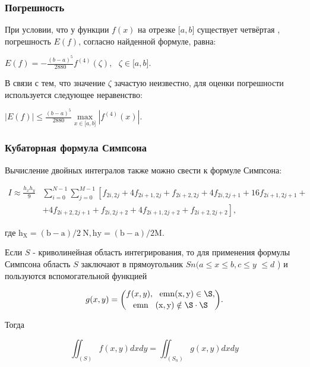 \documentclass[a4paper]{article}
\begin{document}
{{{{{{{{\subsubsection{Погрешность}

При условии, что у функции {{\(f(x)\)}} на отрезке
{{\(\lbrack a,b\rbrack\)}} существует четвёртая , погрешность
{{\(E(f)\)}}, согласно найденной формуле, равна:

\begin{center}
 {{\(E(f) = - \frac{(b - a)^{5}}{2880}{f^{(4)}(\zeta)},\ \ \ \zeta \in \lbrack a,b\rbrack.\)}}
\end{center}

В связи с тем, что значение {{\(\zeta\)}} зачастую неизвестно, для
оценки погрешности используется следующее неравенство:

\begin{center}
 {{\(\left| {E(f)} \right| \leqslant \frac{(b - a)^{5}}{2880}\max\limits_{x \in \lbrack a,b\rbrack}\left| {f^{(4)}(x)} \right|.\)}}
\end{center}


\subsubsection{Кубаторная формула Симпсона}
Вычисление двойных интегралов также можно свести к формуле Симпсона:

$$
\begin{aligned}
I \approx \frac{h_{x} h_{y}}{9} & \sum_{i=0}^{N-1} \sum_{j=0}^{M-1}\left[f_{2 i, 2 j}+4 f_{2 i+1,2 j}+f_{2 i+2,2 j}+4 f_{2 i, 2 j+1}+16 f_{2 i+1,2 j+1}+\right. \\
& \left.+4 f_{2 i+2,2 j+1}+f_{2 i, 2 j+2}+4 f_{2 i+1,2 j+2}+f_{2 i+2,2 j+2}\right],
\end{aligned}
$$

где $\mathrm{h}_{\mathrm{X}}=(\mathrm{b}-\mathrm{a}) / 2 \mathrm{~N}, \mathrm{hy}=(\mathrm{b}-\mathrm{a}) / 2 \mathrm{M}$.

Если $S$ - криволинейная область интегрирования, то для применения формулы Симпсона область $S$ заключают в прямоугольник $S n(a \leq x \leq b, c \leq y$ $\leq d$ ) и пользуются вспомогательной функцией

$$
g(x,y)={\binom{f(x,y),\ \ \mathrm{emn\\(x,y)\in{\S}},}{\mathrm{emn\\(x,y)\notin{\S}\cdot{\S}}}}.
$$

Тогда

$$
\iint_{(S)} f(x, y) d x d y=\iint_{\left(S_{n}\right)} g(x, y) d x d y
$$

}}}}}}}}
\end{document}
